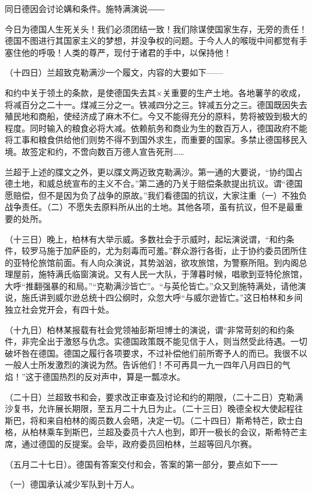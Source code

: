 同日德因会讨论媾和条件。施特满演说――

今日为德国人生死关头！我们必须团结一致！我们除谋使国家生存，无旁的责任！德国不图进行其国家主义的梦想，并没争权的问题。于今人人的喉咙中间都觉有手塞住他的呼吸！人类的尊严，现付于诸君的手中，以保持他！

（十四日）兰超致克勒满沙一个履文，内容的大要如下——

和约中关于领土的条款，是使德国失去其×关重要的生产土地。各地薯芋的收成，将减百分之二十一。煤减三分之一。铁减四分之三。锌减五分之三。德国既因失去殖民地和商船，使经济成了麻木不仁。今又不能得充分的原料，势将被毁到极大的程度。同时输入的粮食必将大减。依赖航务和商业为生的数百万人，德国政府不能将工事和粮食供给他们则势不得不到国外求生，而重要的国家。多禁止德国移民入境。故签定和约，不啻向数百万德人宣告死刑……

兰超于上述的牒文之外，更以牒文两迈致克勒满沙。第一通的大要说，“协约国占德土地，和威总统宣布的主义不合。”第二通的乃关于赔偿条款提出抗议。谓“德国愿赔偿，但不是因为负了战争的原故。”我们看德国的抗议，大家注重（一）不独负战争责任。（二）不愿失去原料所从出的土地。其他各项，虽有抗议，但不是最重要的处所。

（十三日）晚上，柏林有大举示威。多数社会于示威时，起坛演说谓，“和约条件，较罗马施于加萨臣的，尤为刻毒而可羞。”群众游行各街，止于协约委员团所住的亚特伦旅馆前面。有人向众演说，其势汹汹，欲攻旅馆，为警察所阻。到内阁总理屋前，施特满氏临窗演说。又有人民一大队，于薄暮时候，唱歌到亚特伦旅馆，大呼“推翻强暴的和局。”“克勒满沙皆亡”。“与英伦皆亡。”众又到施特满处，请他演说，施氏讲到威尔逊总统十四公纲时，众忽大呼“与威尔逊皆亡。”这日柏林和乡间独立社会党开会，有四十处。

（十九日）柏林某报载有社会党领袖彭斯坦博士的演说，谓“非常苛刻的和约条件，非完全出于激怒与仇念。实德国政策既不能见信于人，则当然受此待遇。一切破坏咎在德国。德国之履行各项要求，不过补偿他们前所寄予人的而已。我很不以一般人士所发激烈的演说为然。告诉他们！不可再具一九一四年八月四日的气焰！”这于德国热烈的反对声中，算是一瓢凉水。

（二十日）兰超致书和会，要求改正审查及讨论和约的期限，（二十二日）克勒满沙复书，允许展长期限，至五月二十九日为止。（二十三日）晚德全权大使起程往斯巴，将和来自柏林的阁员数人会晤，决定一切。（二十四日）斯希特芒，欧士白格，从柏林乘车到斯巴，兰超及委员十六人也到，即开一极长的会议，斯希特芒主席，通过德国的反提案。会毕，政府委员回柏林，兰超等回凡尔赛。

（五月二十七日）。德国有答案交付和会，答案的第一部分，要点如下一一

（一）德国承认减少军队到十万人。

